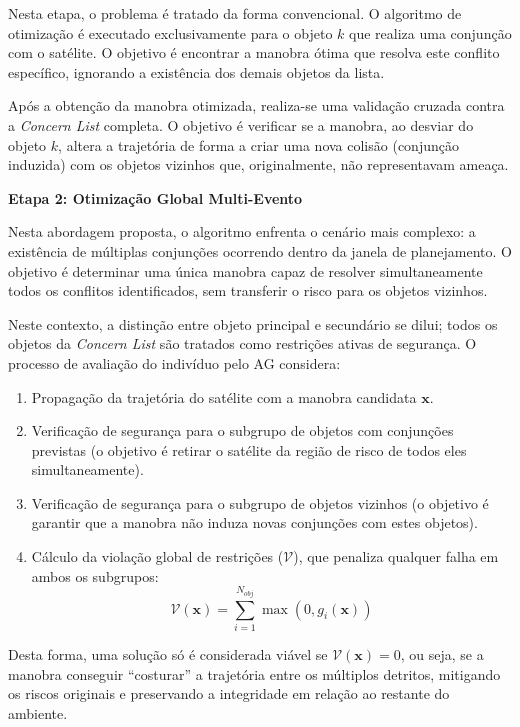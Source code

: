 Nesta etapa, o problema é tratado da forma convencional. O algoritmo de otimização é executado exclusivamente para o objeto $k$ que realiza uma conjunção com o satélite. O objetivo é encontrar a manobra ótima que resolva este conflito específico, ignorando a existência dos demais objetos da lista.

Após a obtenção da manobra otimizada, realiza-se uma validação cruzada contra a \textit{Concern List} completa. O objetivo é verificar se a manobra, ao desviar do objeto $k$, altera a trajetória de forma a criar uma nova colisão (conjunção induzida) com os objetos vizinhos que, originalmente, não representavam ameaça.

\textbf{Etapa 2: Otimização Global Multi-Evento}

Nesta abordagem proposta, o algoritmo enfrenta o cenário mais complexo: a existência de múltiplas conjunções ocorrendo dentro da janela de planejamento. O objetivo é determinar uma única manobra capaz de resolver simultaneamente todos os conflitos identificados, sem transferir o risco para os objetos vizinhos.

Neste contexto, a distinção entre objeto principal e secundário se dilui; todos os objetos da \textit{Concern List} são tratados como restrições ativas de segurança. O processo de avaliação do indivíduo pelo AG considera:

\begin{enumerate}
    \item Propagação da trajetória do satélite com a manobra candidata $\mathbf{x}$.
    \item Verificação de segurança para o subgrupo de objetos com conjunções previstas (o objetivo é retirar o satélite da região de risco de todos eles simultaneamente).
    \item Verificação de segurança para o subgrupo de objetos vizinhos (o objetivo é garantir que a manobra não induza novas conjunções com estes objetos).
    \item Cálculo da violação global de restrições ($\mathcal{V}$), que penaliza qualquer falha em ambos os subgrupos:
    \begin{equation}
        \mathcal{V}(\mathbf{x}) = \sum_{i=1}^{N_{obj}} \max(0, g_i(\mathbf{x}))
        \label{eq:constraint_violation}
    \end{equation}
\end{enumerate}

Desta forma, uma solução só é considerada viável se $\mathcal{V}(\mathbf{x}) = 0$, ou seja, se a manobra conseguir ``costurar'' a trajetória entre os múltiplos detritos, mitigando os riscos originais e preservando a integridade em relação ao restante do ambiente.